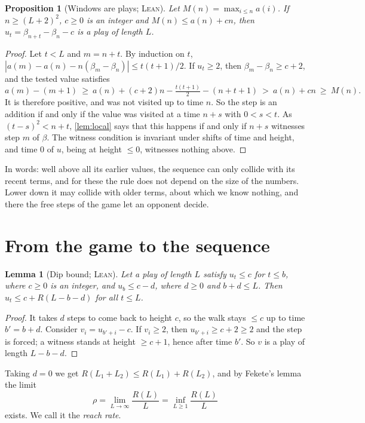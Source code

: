 \documentclass[11pt]{amsart}
\newtheorem{proposition}[theorem]{Proposition}
\newtheorem{lemma}[theorem]{Lemma}
\theoremstyle{definition}
\newcommand{\LEAN}{\textsc{Lean}}
\begin{document}
\begin{proposition}[Windows are plays; \LEAN]\label{prop:window}
Let $M(n)=\max_{i\le n}a(i)$. If $n\ge(L+2)^2$, $c\ge0$ is an integer and $M(n)\le a(n)+cn$, then $u_t=\beta_{n+t}-\beta_n-c$ is a play of
length $L$.
\end{proposition}

\begin{proof}
Let $t<L$ and $m=n+t$. By induction on $t$, $|a(m)-a(n)-n(\beta_m-\beta_n)|\le t(t+1)/2$. If $u_t\ge2$, then
$\beta_m-\beta_n\ge c+2$, and the tested value satisfies
\[
 a(m)-(m+1)\ \ge\ a(n)+(c+2)n-\tfrac{t(t+1)}2-(n+t+1)\ >\ a(n)+cn\ \ge\ M(n).
\]
It is therefore positive, and was not visited up to time $n$. So the step is an addition if and only if the value was visited
at a time $n+s$ with $0<s<t$. As $(t-s)^2<n+t$, \cref{lem:local} says that this happens if and only if $n+s$ witnesses step $m$ of
$\beta$. The witness condition is invariant under shifts of time and height, and time $0$ of $u$, being at height $\le0$, witnesses nothing above.
\end{proof}

In words: well above all its earlier values, the sequence can only collide with its recent terms, and for these the rule does not
depend on the size of the numbers. Lower down it may collide with older terms, about which we know nothing, and there the free steps
of the game let an opponent decide.

\section{From the game to the sequence}\label{sec:reach}

\begin{lemma}[Dip bound; \LEAN]\label{lem:dip}
Let a play of length $L$ satisfy $u_t\le c$ for $t\le b$, where $c\ge0$ is an integer, and $u_b\le c-d$, where $d\ge0$ and
$b+d\le L$. Then $u_t\le c+R(L-b-d)$ for all $t\le L$.
\end{lemma}

\begin{proof}
It takes $d$ steps to come back to height $c$, so the walk stays $\le c$ up to time $b'=b+d$. Consider $v_i=u_{b'+i}-c$.
If $v_i\ge2$, then $u_{b'+i}\ge c+2\ge2$ and the step is forced; a witness stands at height $\ge c+1$, hence after time
$b'$. So $v$ is a play of length $L-b-d$.
\end{proof}

Taking $d=0$ we get $R(L_1+L_2)\le R(L_1)+R(L_2)$, and by Fekete's lemma \cite{Fekete1923} the limit
\[
 \rho=\lim_{L\to\infty}\frac{R(L)}L=\inf_{L\ge1}\frac{R(L)}L
\]
exists. We call it the \emph{reach rate}.
\end{document}
